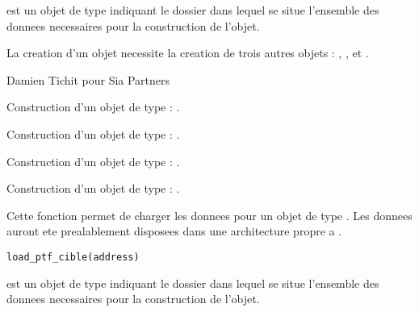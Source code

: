 \documentclass[a4paper]{book}
\begin{document}
%
\begin{Arguments}
\begin{ldescription}
\item[\code{address}] est un objet de type  indiquant le dossier dans lequel se situe l'ensemble des donnees necessaires
pour la construction de l'objet.
\end{ldescription}
\end{Arguments}
%
\begin{Details}\relax
La creation d'un objet  necessite la creation de trois autres objets : , ,  et .
\end{Details}
%
\begin{Author}\relax
Damien Tichit pour Sia Partners
\end{Author}
%
\begin{SeeAlso}\relax
Construction d'un objet de type  : .

Construction d'un objet de type  : .

Construction d'un objet de type  : .

Construction d'un objet de type  : .
\end{SeeAlso}
%
\begin{Description}\relax
Cette fonction permet de charger les donnees pour un objet de type . Les donnees auront ete prealablement disposees dans
une architecture propre a .
\end{Description}
%
\begin{Usage}
\begin{verbatim}
load_ptf_cible(address)
\end{verbatim}
\end{Usage}
%
\begin{Arguments}
\begin{ldescription}
\item[\code{address}] est un objet de type  indiquant le dossier dans lequel se situe l'ensemble des donnees necessaires
pour la construction de l'objet.
\end{ldescription}
\end{Arguments}
\end{document}
